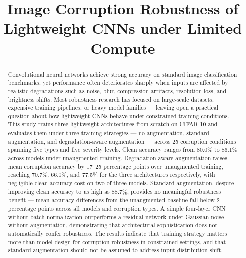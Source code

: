 \documentclass[conference]{IEEEtran}
\begin{document}
\title{Image Corruption Robustness of Lightweight CNNs under Limited Compute}

\author{
\and
{}
}

\maketitle

\begin{abstract}
Convolutional neural networks achieve strong accuracy on standard image classification benchmarks, yet performance often deteriorates sharply when inputs are affected by realistic degradations such as noise, blur, compression artifacts, resolution loss, and brightness shifts. Most robustness research has focused on large-scale datasets, expensive training pipelines, or heavy model families --- leaving open a practical question about how lightweight CNNs behave under constrained training conditions. This study trains three lightweight architectures from scratch on CIFAR-10 and evaluates them under three training strategies --- no augmentation, standard augmentation, and degradation-aware augmentation --- across 25 corruption conditions spanning five types and five severity levels. Clean accuracy ranges from 80.0\% to 86.1\% across models under unaugmented training. Degradation-aware augmentation raises mean corruption accuracy by 17--25 percentage points over unaugmented training, reaching 70.7\%, 66.0\%, and 77.5\% for the three architectures respectively, with negligible clean accuracy cost on two of three models. Standard augmentation, despite improving clean accuracy to as high as 88.7\%, provides no meaningful robustness benefit --- mean accuracy differences from the unaugmented baseline fall below 2 percentage points across all models and corruption types. A simple four-layer CNN without batch normalization outperforms a residual network under Gaussian noise without augmentation, demonstrating that architectural sophistication does not automatically confer robustness. The results indicate that training strategy matters more than model design for corruption robustness in constrained settings, and that standard augmentation should not be assumed to address input distribution shift.
\end{abstract}
\end{document}
